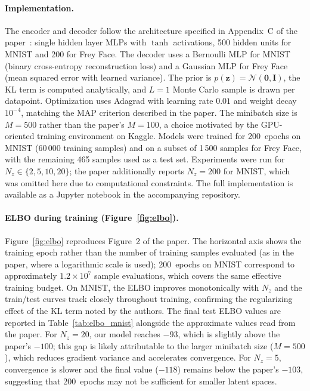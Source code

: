 \documentclass{article}
\begin{document}
\paragraph{Implementation.}
The encoder and decoder follow the architecture specified in Appendix~C of the
paper~\cite{kingma2013}: single hidden layer MLPs with $\tanh$ activations, 500
hidden units for MNIST and 200 for Frey Face. The decoder uses a Bernoulli MLP for
MNIST (binary cross-entropy reconstruction loss) and a Gaussian MLP for Frey Face
(mean squared error with learned variance). The prior is $p(\mathbf{z}) =
\mathcal{N}(\mathbf{0}, \mathbf{I})$, the KL term is computed analytically, and
$L=1$ Monte Carlo sample is drawn per datapoint. Optimization uses Adagrad with
learning rate $0.01$ and weight decay $10^{-4}$, matching the MAP criterion described
in the paper. The minibatch size is $M=500$ rather than the paper's $M=100$, a choice
motivated by the GPU-oriented training environment on Kaggle.
Models were trained for 200~epochs on MNIST (60\,000 training samples) and on
a subset of 1\,500 samples for Frey Face, with the remaining 465 samples used as
a test set. Experiments were run for $N_z \in \{2, 5, 10, 20\}$; the paper additionally
reports $N_z = 200$ for MNIST, which was omitted here due to computational constraints.
The full implementation is available as a Jupyter notebook in the accompanying
repository.

\paragraph{ELBO during training (Figure~\ref{fig:elbo}).}
Figure~\ref{fig:elbo} reproduces Figure~2 of the paper. The horizontal axis shows the
training epoch rather than the number of training samples evaluated (as in the paper,
where a logarithmic scale is used); 200~epochs on MNIST correspond to approximately
$1.2 \times 10^7$ sample evaluations, which covers the same effective training budget.
On MNIST, the ELBO improves monotonically with $N_z$ and the train/test curves
track closely throughout training, confirming the regularizing effect of the KL term
noted by the authors. The final test ELBO values are reported in
Table~\ref{tab:elbo_mnist} alongside the approximate values read from the paper.
For $N_z = 20$, our model reaches $-93$, which is slightly above the paper's $-100$;
this gap is likely attributable to the larger minibatch size ($M=500$), which reduces
gradient variance and accelerates convergence.
For $N_z = 5$, convergence is slower and the final value ($-118$) remains below the
paper's $-103$, suggesting that 200~epochs may not be sufficient for smaller latent
spaces.
\end{document}
